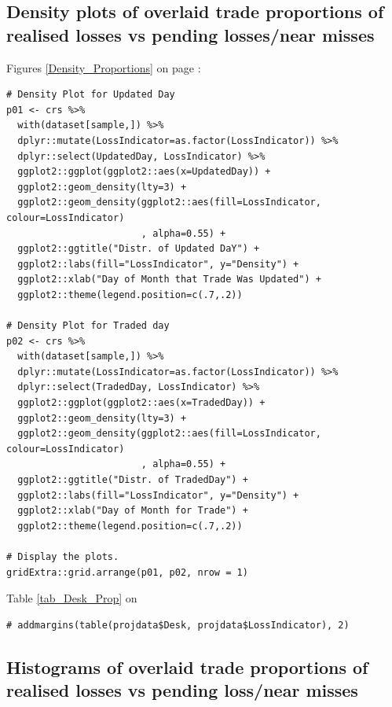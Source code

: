 \documentclass{DissertateUSU}
\begin{document}
\normalsize

\subsection{Density plots of overlaid trade proportions of realised losses vs pending losses/near misses}
\label{ssec:Density plots}

Figures \ref{Density_Proportions} on page \pageref{Density_Proportions}:

\small

\begin{verbatim}
# Density Plot for Updated Day
p01 <- crs %>%
  with(dataset[sample,]) %>%
  dplyr::mutate(LossIndicator=as.factor(LossIndicator)) %>%
  dplyr::select(UpdatedDay, LossIndicator) %>%
  ggplot2::ggplot(ggplot2::aes(x=UpdatedDay)) +
  ggplot2::geom_density(lty=3) +
  ggplot2::geom_density(ggplot2::aes(fill=LossIndicator, colour=LossIndicator)
                        , alpha=0.55) +
  ggplot2::ggtitle("Distr. of Updated DaY") +
  ggplot2::labs(fill="LossIndicator", y="Density") +
  ggplot2::xlab("Day of Month that Trade Was Updated") +
  ggplot2::theme(legend.position=c(.7,.2))

# Density Plot for Traded day
p02 <- crs %>%
  with(dataset[sample,]) %>%
  dplyr::mutate(LossIndicator=as.factor(LossIndicator)) %>%
  dplyr::select(TradedDay, LossIndicator) %>%
  ggplot2::ggplot(ggplot2::aes(x=TradedDay)) +
  ggplot2::geom_density(lty=3) +
  ggplot2::geom_density(ggplot2::aes(fill=LossIndicator, colour=LossIndicator)
                        , alpha=0.55) +
  ggplot2::ggtitle("Distr. of TradedDay") +
  ggplot2::labs(fill="LossIndicator", y="Density") +
  ggplot2::xlab("Day of Month for Trade") +
  ggplot2::theme(legend.position=c(.7,.2))

# Display the plots.
gridExtra::grid.arrange(p01, p02, nrow = 1)
\end{verbatim}

\normalsize

Table \ref{tab_Desk_Prop} on \pageref{tab_Desk_Prop}

\small

\begin{verbatim}
# addmargins(table(projdata$Desk, projdata$LossIndicator), 2)
\end{verbatim}

\normalsize

\subsection{Histograms of overlaid trade proportions of realised losses vs pending loss/near misses}
\label{ssec:Histogram proportions}
\end{document}
